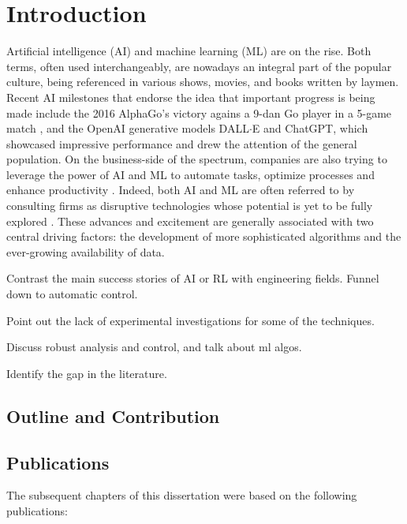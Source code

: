 \cleardoublepage
\chapter{Introduction}

Artificial intelligence (AI) and machine learning (ML) are on the rise. Both terms, often used interchangeably, are nowadays an integral part of the popular culture, being referenced in various shows, movies, and books written by laymen. Recent AI milestones that endorse the idea that important progress is being made include the 2016 AlphaGo's victory agains a 9-dan Go player in a 5-game match \citep{silver2016mastering}, and the OpenAI generative models DALL$\cdot$E and ChatGPT, which showcased impressive performance and drew the attention of the general population. On the business-side of the spectrum, companies are also trying to leverage the power of AI and ML to automate tasks, optimize processes and enhance productivity \citep{Chui2022}. Indeed, both AI and ML are often referred to by consulting firms as disruptive technologies whose potential is yet to be fully explored \citep{Bechtel2022}. These advances and excitement are generally associated with two central driving factors: the development of more sophisticated algorithms and the ever-growing availability of data.

Contrast the main success stories of AI or RL with engineering fields. Funnel down to automatic control.

Point out the lack of experimental investigations for some of the techniques.

Discuss robust analysis and control, and talk about ml algos.

Identify the gap in the literature.


\section{Outline and Contribution}

\section{Publications}

The subsequent chapters of this dissertation were based on the following publications:

